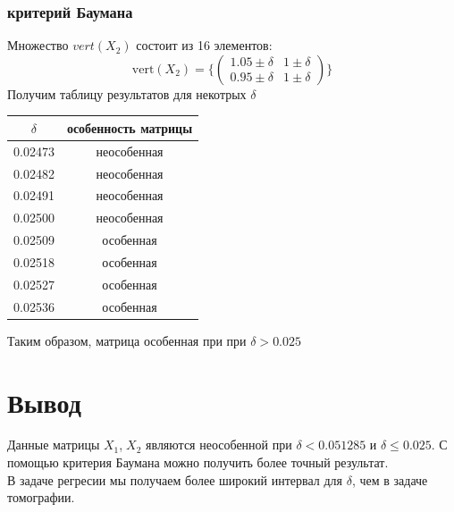 \documentclass[a4paper,12pt]{article}
\begin{document}
\subsubsection{критерий Баумана}
Множество $vert(X_2)$ состоит из 16 элементов:
\begin{equation}
\mathrm{vert}(X_2)=
   \biggl\{
        \begin{pmatrix}
        1.05 \pm \delta & 1 \pm \delta \\
        0.95 \pm \delta & 1\pm \delta
        \end{pmatrix}
        \biggl\}
\end{equation}
Получим таблицу результатов для некотрых $\delta$
\begin{table}[H]
\begin{center}
\begin{tabular}{|c|c|}
\hline
$\delta$ & особенность матрицы \\
\hline
0.02473 &   неособенная\\
0.02482 &   неособенная\\
0.02491 &   неособенная\\
0.02500  &  неособенная\\
0.02509 &   особенная\\
0.02518  &  особенная\\
0.02527  &  особенная\\
0.02536  &  особенная\\
\hline
\end{tabular}
\end{center}
\end{table} 
Таким образом, матрица особенная при при $\delta > 0.025$



\section{Вывод}
Данные матрицы $X_1$,$\;X_2$  являются  неособенной при $\delta < 0.051285$ и $\delta \le 0.025$. С помощью критерия Баумана можно получить более точный результат.\\ 
В задаче регресии мы получаем более широкий интервал для $\delta$, чем в задаче томографии.
\end{document}
